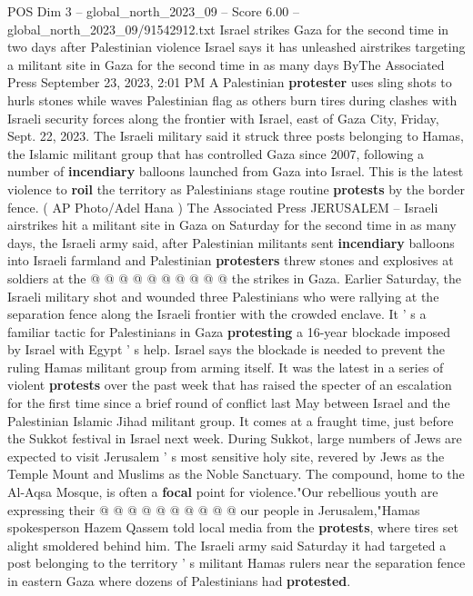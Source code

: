 \begin{textsample}{POS Dim 3 – global\_north\_2023\_09 – Score 6.00 – global\_north\_2023\_09/91542912.txt}  \label{ex:f3_pos_064}
Israel strikes Gaza for the second time in two days after Palestinian violence Israel says it has unleashed airstrikes targeting a militant site in Gaza for the second time in as many days ByThe Associated Press September 23, 2023, 2:01 PM A Palestinian \textbf{protester} uses sling shots to hurls stones while waves Palestinian flag as others burn tires during clashes with Israeli security forces along the frontier with Israel, east of Gaza City, Friday, Sept. 22, 2023.
The Israeli military said it struck three posts belonging to Hamas, the Islamic militant group that has controlled Gaza since 2007, following a number of \textbf{incendiary} balloons launched from Gaza into Israel.
This is the latest violence to \textbf{roil} the territory as Palestinians stage routine \textbf{protests} by the border fence. ( AP Photo/Adel Hana ) The Associated Press JERUSALEM -- Israeli airstrikes hit a militant site in Gaza on Saturday for the second time in as many days, the Israeli army said, after Palestinian militants sent \textbf{incendiary} balloons into Israeli farmland and Palestinian \textbf{protesters} threw stones and explosives at soldiers at the @ @ @ @ @ @ @ @ @ @ the strikes in Gaza.
Earlier Saturday, the Israeli military shot and wounded three Palestinians who were rallying at the separation fence along the Israeli frontier with the crowded enclave.
It ' s a familiar tactic for Palestinians in Gaza \textbf{protesting} a 16-year blockade imposed by Israel with Egypt ' s help.
Israel says the blockade is needed to prevent the ruling Hamas militant group from arming itself.
It was the latest in a series of violent \textbf{protests} over the past week that has raised the specter of an escalation for the first time since a brief round of conflict last May between Israel and the Palestinian Islamic Jihad militant group.
It comes at a fraught time, just before the Sukkot festival in Israel next week.
During Sukkot, large numbers of Jews are expected to visit Jerusalem ' s most sensitive holy site, revered by Jews as the Temple Mount and Muslims as the Noble Sanctuary.
The compound, home to the Al-Aqsa Mosque, is often a \textbf{focal} point for violence."Our rebellious youth are expressing their @ @ @ @ @ @ @ @ @ @ our people in Jerusalem,"Hamas spokesperson Hazem Qassem told local media from the \textbf{protests}, where tires set alight smoldered behind him.
The Israeli army said Saturday it had targeted a post belonging to the territory ' s militant Hamas rulers near the separation fence in eastern Gaza where dozens of Palestinians had \textbf{protested}.

\end{textsample}
